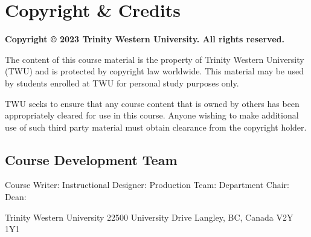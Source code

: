 \documentclass[
]{book}
\begin{document}
\hypertarget{copyright-credits}{%
\section*{Copyright \& Credits}\label{copyright-credits}}

\textbf{Copyright © 2023 Trinity Western University. All rights reserved.}

The content of this course material is the property of Trinity Western University (TWU) and is protected by copyright law worldwide. This material may be used by students enrolled at TWU for personal study purposes only.

TWU seeks to ensure that any course content that is owned by others has been appropriately cleared for use in this course. Anyone wishing to make additional use of such third party material must obtain clearance from the copyright holder.

\hypertarget{course-development-team}{%
\subsection{Course Development Team}\label{course-development-team}}

Course Writer:
Instructional Designer:
Production Team:
Department Chair:
Dean:

Trinity Western University
22500 University Drive
Langley, BC, Canada \textbar{} V2Y 1Y1

  
\end{document}
